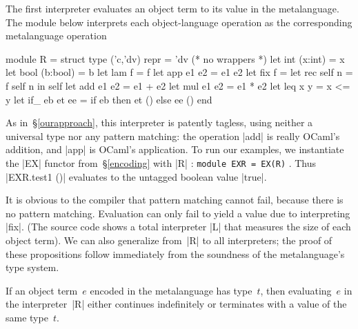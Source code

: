 The first interpreter evaluates an object term to its value in the
metalanguage.  The module below interprets each object\hyp language
operation as the corresponding metalanguage operation
\vspace*{-0.8em}\begin{code3}
module R = struct type ('c,'dv) repr = 'dv (* no wrappers *)
  let int  (x:int)  = x         let bool (b:bool) = b
  let lam  f        = f         let app  e1 e2    = e1 e2
  let fix  f        = let rec self n = f self n in self
  let add  e1 e2    = e1 + e2   let mul  e1 e2    = e1 * e2
  let leq  x y      = x <= y
  let if_  eb et ee = if eb then et () else ee () end
\end{code3}
\vspace*{-0.8em}
%
As in~\S\ref{ourapproach},
this interpreter is patently tagless, using neither a universal type nor
any pattern matching: the operation |add| is really
OCaml's addition, and |app| is OCaml's application. To run our
examples, we instantiate the |EX| functor from~\S\ref{encoding} with |R|%
: \texttt{module EXR = EX(R)}%
.
Thus |EXR.test1 ()| evaluates to the untagged boolean value |true|.
\begin{comment}
In Haskell, we define
\begin{code}
newtype R a = R {unR::a}
instance Symantics R where ...
\end{code}
Although |R| looks like a tag, it is only
a |newtype|.  The types |a| and |R a| are represented differently
only at compile time, not at run time.  Pattern matching against~|R|
cannot ever fail and is assuredly compiled away.
In OCaml, too, it is obvious to the compiler that
\end{comment}
It is obvious to the compiler that
%
pattern matching cannot fail, because there is no
pattern matching. Evaluation can only fail to yield a value
due to interpreting |fix|.
(The source code shows a total interpreter |L| that measures
the size of each object term).
We can also generalize from~|R| to all interpreters; the proof
of these propositions follow immediately from the soundness of the
metalanguage's type system.
\begin{proposition}
If an object term~$e$ encoded in the metalanguage has type~$t$,
then evaluating~$e$ in the interpreter~|R| either continues
indefinitely or terminates with a value of the same type~$t$.
\end{proposition}
